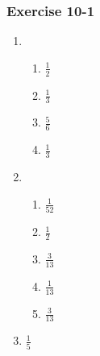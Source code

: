 {\begin{multicols}{3}
\subsubsection*{Exercise 10-1} %
  \begin{enumerate}[noitemsep, label=\textbf{\arabic*}. ]
  \item %
    \begin{enumerate}[itemsep=1pt, label=\textbf{(\alph*)} ]
    \item $\frac{1}{2}$%
    \item $\frac{1}{3}$%
    \item $\frac{5}{6}$%
    \item $\frac{1}{3}$%
    \end{enumerate}
  \item %
    \begin{enumerate}[itemsep=1pt, label=\textbf{(\alph*)} ]
    \item $\frac{1}{52}$%
    \item $\frac{1}{2}$%
    \item $\frac{3}{13}$%
    \item $\frac{1}{13}$%
    \item $\frac{3}{13}$%
    \end{enumerate}
\item $\frac{1}{5}$%

\end{enumerate}



\end{multicols}}
